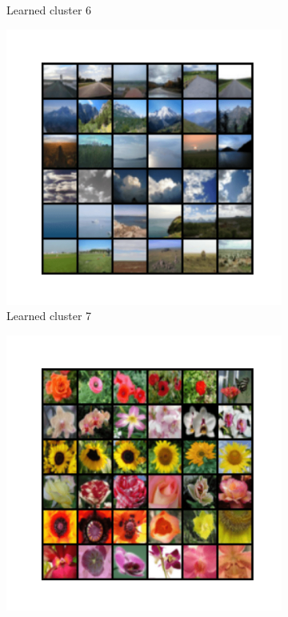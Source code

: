 \documentclass[10pt,twocolumn,letterpaper]{article}
\begin{document}
\begin{figure}
\begin{subfigure}{0.32\textwidth}
       \caption{Learned cluster 6}
     \end{subfigure}
     \hfill
     \begin{subfigure}{0.32\textwidth}
       \includegraphics[width=\linewidth,trim={1cm 2cm 1cm 2cm},clip]{figures/experiments/cifar100_cluster/nearest_class6.png}
       \caption{Learned cluster 7}
     \end{subfigure}
     \hfill
     \begin{subfigure}{0.32\textwidth}
       \includegraphics[width=\linewidth,trim={1cm 2cm 1cm 2cm},clip]{figures/experiments/cifar100_cluster/nearest_class7.png}

\end{subfigure}
\end{figure}
\end{document}
